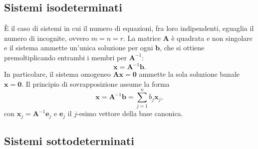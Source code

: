 \subsection{Sistemi isodeterminati}\label{par:isodeterminati}


È il caso di sistemi in cui il numero di equazioni, fra loro
indipendenti, eguaglia il numero di incognite, ovvero $m=n=r$.
La matrice $\bm{A}$ è quadrata e non singolare e il sistema
ammette un'unica soluzione per ogni $\bm{b}$, che si ottiene
premoltiplicando entrambi i membri per $\bm{A}^{-1}$:
\begin{equation}\label{sol_iso}
	\bm{x}=\bm{A}^{-1} \bm{b}.
\end{equation}
In particolare, il sistema omogeneo $\bm{A}\bm{x}=\bm{0}$ ammette
la sola soluzione banale $\bm{x}=\bm{0}$. Il principio di
sovrapposizione assume la forma
\begin{equation}
	\bm{x} = \bm{A}^{-1}\bm{b} = \sum_{j=1}^n b_j \bm{x}_j ,
\end{equation}
con $\bm{x}_j = \bm{A}^{-1}\bm{e}_j$ e $\bm{e}_j$ il $j$-esimo
vettore della base canonica.



\subsection{Sistemi sottodeterminati}\label{par:sottodeterminati}

